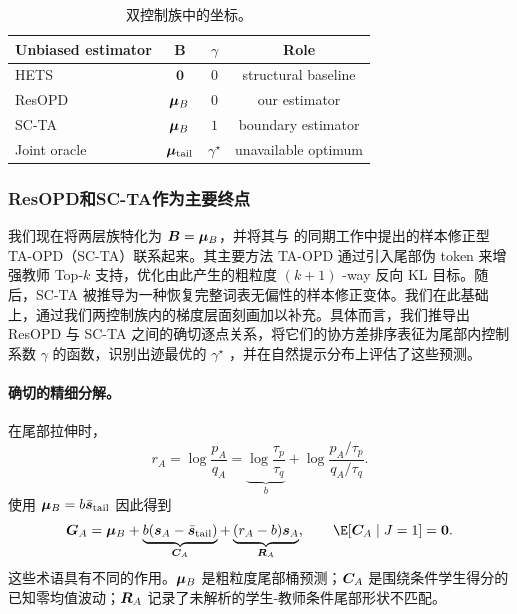 \begin{table}[t]
\caption{双控制族中的坐标。}
\label{tab:estimator-map}
\centering
\begin{tabular*}{0.7\linewidth}{@{\extracolsep{\fill}} lccc @{}}
\toprule
Unbiased estimator & $\bm B$ & $\gamma$ & Role \\
\midrule
HETS & $\bm 0$ & $0$ & structural baseline \\
ResOPD & $\bm{\mu}_B$ & $0$ & our estimator \\
SC-TA & $\bm{\mu}_B$ & $1$ & boundary estimator \\
Joint oracle & $\bm{\mu}_{\mathrm{tail}}$ & $\gamma^\star$ & unavailable optimum \\
\bottomrule
\end{tabular*}
\end{table}
\subsubsection{ResOPD和SC-TA作为主要终点}
\label{sec:gamma}

我们现在将两层族特化为 $\bm B=\bm{\mu}_B$，并将其与 \citet{huang2026tail} 的同期工作中提出的样本修正型 TA-OPD（SC-TA）联系起来。其主要方法 TA-OPD 通过引入尾部伪 token 来增强教师 Top-$k$ 支持，优化由此产生的粗粒度 $(k+1)$ -way 反向 KL 目标。随后，SC-TA 被推导为一种恢复完整词表无偏性的样本修正变体。我们在此基础上，通过我们两控制族内的梯度层面刻画加以补充。具体而言，我们推导出 ResOPD 与 SC-TA 之间的确切逐点关系，将它们的协方差排序表征为尾部内控制系数 $\gamma$ 的函数，识别出迹最优的 $\gamma^\star$ ，并在自然提示分布上评估了这些预测。

\paragraph{确切的精细分解。}
在尾部拉伸时，
\begin{equation}
 r_A
 =\log\frac{p_A}{q_A}
 =\underbrace{\log\frac{\tau_p}{\tau_q}}_{b}
 +\log\frac{p_A/\tau_p}{q_A/\tau_q}.
\end{equation}
使用 $\bm{\mu}_B=b\bar{\bm{s}}_{\mathrm{tail}}$  因此得到
\begin{equation}
 \btoken_A
 =\bmean_B
 +\underbrace{b(\bscore_A-\bar{\bscore}_{\mathrm{tail}})}_{\bfluct_A}
 +\underbrace{(r_A-b)\bscore_A}_{\bresid_A},
 \qquad
 \E[\bfluct_A\mid J=1]=\bm 0.
 \label{eq:tail-exact-decomposition}
\end{equation}
这些术语具有不同的作用。$\bm{\mu}_B$ 是粗粒度尾部桶预测；$\bm{C}_A$ 是围绕条件学生得分的已知零均值波动；$\bm{R}_A$ 记录了未解析的学生-教师条件尾部形状不匹配。

